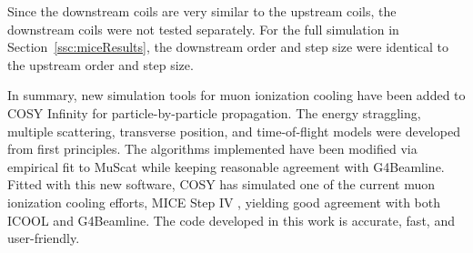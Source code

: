 Since the downstream coils are very similar to the upstream coils, the downstream coils were not tested separately. For the full simulation in Section~\ref{ssc:miceResults}, the downstream order and step size were identical to the upstream order and step size.

\label{sec:summary}

In summary, new simulation tools for muon ionization cooling have been added to COSY Infinity for particle-by-particle propagation. The energy straggling, multiple scattering, transverse position, and time-of-flight models were developed from first principles. The algorithms implemented have been modified via empirical fit to MuScat \cite{muscat} while keeping reasonable agreement with G4Beamline. Fitted with this new software, COSY has simulated one of the current muon ionization cooling efforts, MICE Step IV \cite{mice}, yielding good agreement with both ICOOL and G4Beamline. The code developed in this work is accurate, fast, and user-friendly.